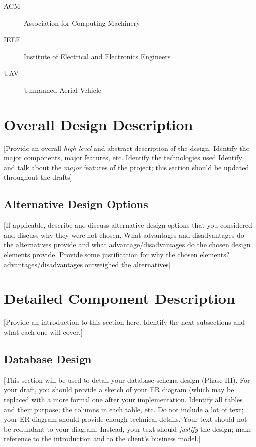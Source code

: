 \documentclass[12pt]{scrartcl} %
\begin{document}
\begin{description}
  \item[ACM] Association for Computing Machinery
  \item[IEEE] Institute of Electrical and Electronics Engineers
  \item[UAV] Unmanned Aerial Vehicle
\end{description}
  
\section{Overall Design Description}
\label{section:overallDesignDescription}
  
[Provide an overall \emph{high-level} and abstract description of the design.
Identify the major components, major features, etc.  Identify the technologies used
Identify and talk about the \emph{major} features of the project; this section
should be updated throughout the drafts]

\subsection{Alternative Design Options}

[If applicable, describe and discuss alternative design options that 
you considered and discuss why they were not chosen.  What advantages 
and disadvantages do the alternatives provide and what advantage/disadvantages 
do the chosen design elements provide.  Provide some justification for why the 
chosen elements? advantages/disadvantages outweighed the alternatives]

\section{Detailed Component Description}
\label{section:detailedDesignDescription}

[Provide an introduction to this section here.  Identify the next subsections
and what each one will cover.]


\subsection{Database Design}

[This section will be used to detail your database schema design (Phase III).
For your draft, you should provide a sketch of your ER diagram (which may
be replaced with a more formal one after your implementation.  Identify all tables
and their purpose; the columns in each table, etc.  Do not include a lot of 
text; your ER diagram should provide enough technical details.  Your text should
not be redundant to your diagram.  Instead, your text should \emph{justify}
the design; make reference to the introduction and to the client's business model.]
\end{document}
